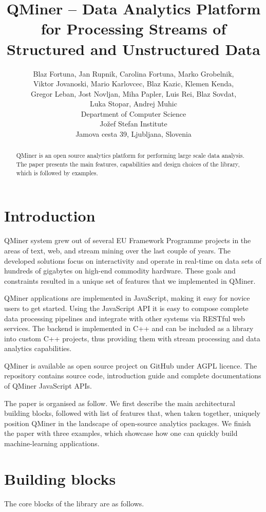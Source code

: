 \documentclass{article} %
\title{QMiner – Data Analytics Platform for Processing Streams of Structured and Unstructured Data}
\author{
Blaz Fortuna, Jan Rupnik, Carolina Fortuna, Marko Grobelnik, \\
Viktor Jovanoski, Mario Karlovcec, Blaz Kazic, Klemen Kenda, \\
Gregor Leban, Jost Novljan, Miha Papler, Luis Rei, Blaz Sovdat, \\
Luka Stopar, Andrej Muhic \\
Department of Computer Science\\
Jožef Stefan Institute\\
Jamova cesta 39, Ljubljana, Slovenia \\
}
\begin{document}
\maketitle

\begin{abstract}
QMiner is an open source analytics platform for performing large scale data analysis.
The paper presents the main features, capabilities and design choices of the library, which
is followed by examples.\end{abstract}

\section{Introduction}
QMiner system grew out of several EU Framework Programme projects in the areas of text, web, and stream mining over the last couple of years. The developed solutions focus on interactivity and operate in real-time on data sets of hundreds of gigabytes on high-end commodity hardware. These goals and constraints resulted in a unique set of features that we implemented in QMiner.

QMiner applications are implemented in JavaScript, making it easy for novice users to get started. Using the JavaScript API it is easy to compose complete data processing pipelines and integrate with other systems via RESTful web services. The backend is implemented in C++ and can be included as a library into custom C++ projects, thus providing them with stream processing and data analytics capabilities.

QMiner is available as open source project on GitHub under AGPL licence. The repository contains source code, introduction guide and complete documentations of QMiner JavaScript APIs.

The paper is organised as follow. We first describe the main architectural building blocks, followed with list of features that, when taken together, uniquely position QMiner in the landscape of open-source analytics packages. We finish the paper with three examples, which showcase how one can quickly build machine-learning applications.

\section{Building blocks}
The core blocks of the library are as follows.
\end{document}
